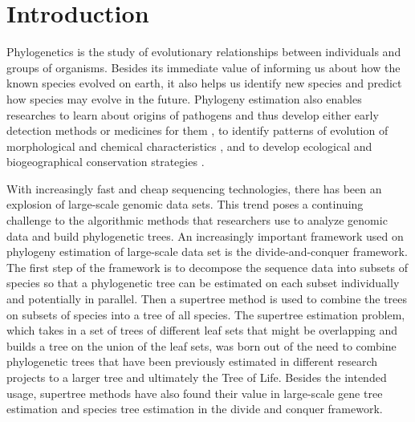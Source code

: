 \documentclass[twocolumn]{bmcart}%
\theoremstyle{mystyle}
\theoremstyle{proofstyle}
\begin{document}



\section{Introduction}
Phylogenetics is the study of evolutionary relationships between individuals and groups of organisms. Besides its immediate value of informing us about how the known species evolved on earth, it also helps us identify new species and predict how species may evolve in the future. Phylogeny estimation also enables researches to learn about origins of pathogens and thus develop either early detection methods or medicines for them \cite{phylogenymedicine}, to identify patterns of evolution of morphological and chemical characteristics \cite{phylogenycharacter}, and to develop ecological and biogeographical conservation strategies \cite{phylogenyconservation}.

With increasingly fast and cheap sequencing technologies, there has been an explosion of large-scale genomic data sets. This trend poses a continuing challenge to the algorithmic methods that researchers use to analyze genomic data and build phylogenetic trees. An increasingly important framework used on phylogeny estimation of large-scale data set is the divide-and-conquer framework. The first step of the framework is to decompose the sequence data into subsets of species so that a phylogenetic tree can be estimated on each subset individually and potentially in parallel. Then a supertree method is used to combine the trees on subsets of species into a tree of all species. The supertree estimation problem, which takes in a set of trees of different leaf sets that might be overlapping and builds a tree on the union of the leaf sets, was born out of the need to combine phylogenetic trees that have been previously estimated in different research projects to a larger tree and ultimately the Tree of Life. Besides the intended usage, supertree methods have also found their value in large-scale gene tree estimation and species tree estimation in the divide and conquer framework.   
\end{document}
